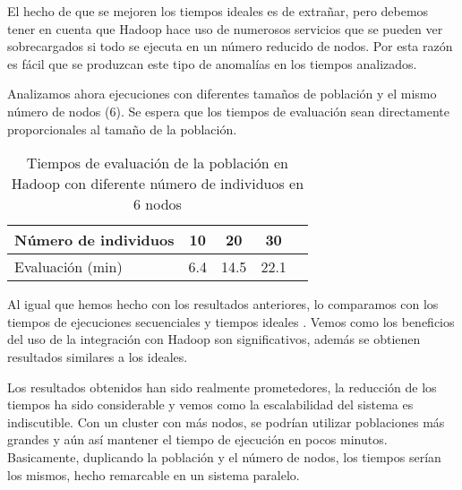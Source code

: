 El hecho de que se mejoren los tiempos ideales es de extra\~nar, pero debemos tener en cuenta que Hadoop hace uso de numerosos servicios que se pueden ver sobrecargados si todo se ejecuta en un n\'umero reducido de nodos. Por esta raz\'on es f\'acil que se produzcan este tipo de anomal\'ias en los tiempos analizados.

Analizamos ahora ejecuciones con diferentes tama\~nos de poblaci\'on y el mismo n\'umero de nodos (6). Se espera que los tiempos de evaluaci\'on sean directamente proporcionales al tama\~no de la poblaci\'on.

\begin{table}[H]
  \begin{center}
    \begin{center}
    \begin{tabular}{l | c c c c}
    N\'umero de individuos & 10 & 20 & 30 \\ \hline
    Evaluaci\'on (min) & 6.4 & 14.5 & 22.1 \\
    \end{tabular}
    \end{center}
    \caption{Tiempos de evaluaci\'on de la poblaci\'on en Hadoop con diferente n\'umero de individuos en 6 nodos}
    \label{tabla-dif-num-indiv}
  \end{center}
\end{table}


Al igual que hemos hecho con los resultados anteriores, lo comparamos con los tiempos de ejecuciones secuenciales y tiempos ideales . Vemos como los beneficios del uso de la integraci\'on con Hadoop son significativos, adem\'as se obtienen resultados similares a los ideales.

Los resultados obtenidos han sido realmente prometedores, la reducci\'on de los tiempos ha sido considerable y vemos como la escalabilidad del sistema es indiscutible. Con un cluster con m\'as nodos, se podr\'ian utilizar poblaciones m\'as grandes y a\'un as\'i mantener el tiempo de ejecuci\'on en pocos minutos. Basicamente, duplicando la poblaci\'on y el n\'umero de nodos, los tiempos ser\'ian los mismos, hecho remarcable en un sistema paralelo.













